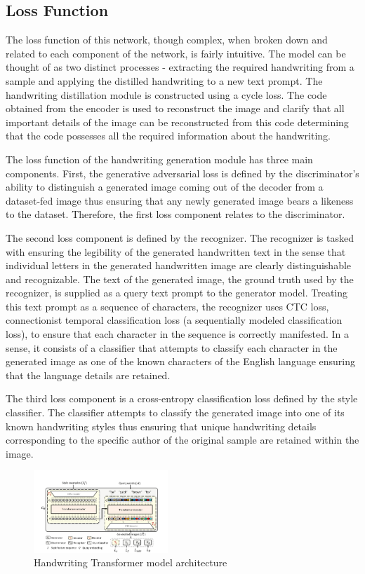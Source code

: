 \documentclass[10pt,twocolumn,letterpaper]{article}
\begin{document}
\subsection{Loss Function}

The loss function of this network, though complex, when broken down and related to each component of the network, is fairly intuitive. The model can be thought of as two distinct processes - extracting the required handwriting from a sample and applying the distilled handwriting to a new text prompt. The handwriting distillation module is constructed using a cycle loss. The code obtained from the encoder is used to reconstruct the image and clarify that all important details of the image can be reconstructed from this code determining that the code possesses all the required information about the handwriting.

The loss function of the handwriting generation module has three main components. First, the generative adversarial loss is defined by the discriminator's ability to distinguish a generated image coming out of the decoder from a dataset-fed image thus ensuring that any newly generated image bears a likeness to the dataset. Therefore, the first loss component relates to the discriminator.

The second loss component is defined by the recognizer. The recognizer is tasked with ensuring the legibility of the generated handwritten text in the sense that individual letters in the generated handwritten image are clearly distinguishable and recognizable. The text of the generated image, the ground truth used by the recognizer, is supplied as a query text prompt to the generator model. Treating this text prompt as a sequence of characters, the recognizer uses CTC loss, connectionist temporal classification loss (a sequentially modeled classification loss), to ensure that each character in the sequence is correctly manifested. In a sense, it consists of a classifier that attempts to classify each character in the generated image as one of the known characters of the English language ensuring that the language details are retained.

The third loss component is a cross-entropy classification loss defined by the style classifier. The classifier attempts to classify the generated image into one of its known handwriting styles thus ensuring that unique handwriting details corresponding to the specific author of the original sample are retained within the image.

\begin{figure}[!t]
  \centering
  \includegraphics[width=0.45\textwidth]{../latex-src/Images/Architecture.png}
  \caption{Handwriting Transformer model architecture}
  \label{fig:arch}
\end{figure}
\end{document}
